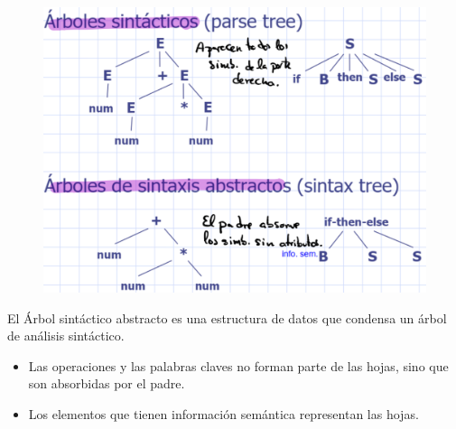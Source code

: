 \documentclass[12pt, twoside, openright]{report} %
\begin{document}
\begin{figure}[H]
  {\includegraphics[scale=.25]{2021-05-01 01_21_28-05_resum_Sem_2021.pdf - Foxit Reader.png}}
\end{figure}

El Árbol sintáctico abstracto es una estructura de datos que condensa un árbol de análisis sintáctico. 
\begin{itemize}
  \item Las operaciones y las palabras claves no forman parte de las hojas, sino que son absorbidas por el padre. 
  \item Los elementos que tienen información semántica representan las hojas.
\end{itemize}
\end{document}
